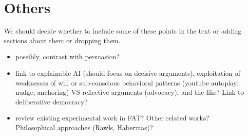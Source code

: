 \documentclass[version=3.21, pagesize, twoside=off, bibliography=totoc, DIV=calc, fontsize=12pt, a4paper, french, english]{scrartcl}
\begin{document}
\section{Others}
We should decide whether to include some of these points in the text or adding sections about them or dropping them.
\begin{itemize}
	\item possibly, contrast with persuasion?
	\item link to explainable AI (should focus on decisive arguments), exploitation of weaknesses of will or sub-conscious behavioral patterns (youtube autoplay; nudge; anchoring) VS reflective arguments (advocacy), and the like? Link to deliberative democracy?
	\item review existing experimental work in FAT? Other related works? Philosophical approaches (Rawls, Habermas)?
\end{itemize}

%
\end{document}
